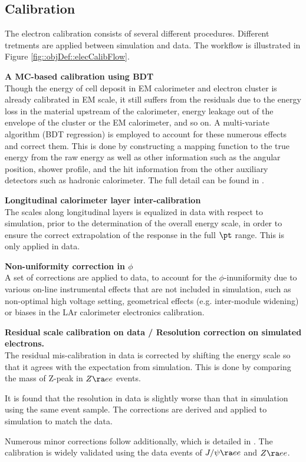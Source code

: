 \subsection{Calibration} \label{sec::objDef::electrons::calib}
The electron calibration consists of several different procedures.
Different tretments are applied between simulation and data.
The workflow is illustrated in Figure \ref{fig::objDef::elecCalibFlow}.

\begin{description}
\item \textbf{A MC-based calibration using BDT} \\
Though the energy of cell deposit in EM calorimeter and electron cluster is already calibrated in EM scale, 
it still suffers from the residuals due to the energy loss in the material upstream of the calorimeter, energy leakage out of the envelope of the cluster or the EM calorimeter, and so on.
A multi-variate algorithm (BDT regression) is employed to account for these numerous effects and correct them. 
This is done by constructing a mapping function to the true energy from the raw energy as well as other information such as the angular position, shower profile, and the hit information from the other auxiliary detectors such as hadronic calorimeter.
The full detail can be found in \cite{161_egammaCalibRun1} \cite{egammaCalib2015}. 

\item \textbf{Longitudinal calorimeter layer inter-calibration} \\
The scales along longitudinal layers is equalized in data with respect to simulation, prior to the determination of the overall energy scale, in order to ensure the correct extrapolation of the response in the full $\pt$ range. This is only applied in data.

\item \textbf{Non-uniformity correction in $\phi$} \\
A set of corrections are applied to data, to account for the $\phi$-inuniformity due to various on-line instrumental effects that are not included in simulation, such as non-optimal high voltage setting, geometrical effects (e.g. inter-module widening) or biases in the LAr calorimeter electronics calibration.

\item \textbf{Residual scale calibration on data / Resolution correction on simulated electrons.}  \\
The residual mis-calibration in data is corrected by shifting the energy scale so that it agrees with the expectation from simulation. This is done by comparing the mass of Z-peak in $Z \ra ee$ events.

It is found that the resolution in data is slightly worse than that in simulation using the same event sample.
The corrections are derived and applied to simulation to match the data. 
\end{description}
Numerous minor corrections follow additionally, which is detailed in \cite{161_egammaCalibRun1}. 
The calibration is widely validated using the data events of $J/\psi \ra e e$ and $Z\ra ee$. \\

